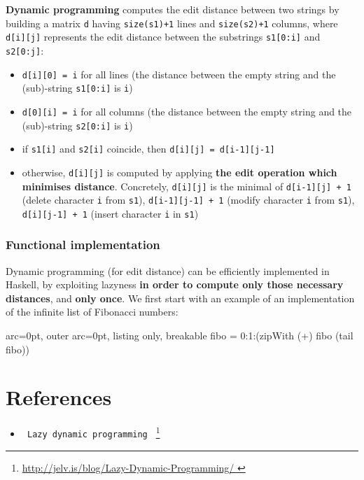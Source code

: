 \textbf{ Dynamic programming } computes the edit distance between two strings by building a matrix \texttt{d} having \texttt{size(s1)+1} lines and \texttt{size(s2)+1} columns, where \texttt{d[i][j]} represents the edit distance between the substrings \texttt{s1[0:i]} and \texttt{s2[0:j]}:
\begin{itemize}
	\item  \texttt{d[i][0] = i} for all lines (the distance between the empty string and the (sub)-string \texttt{s1[0:i]} is \texttt{i})
	\item  \texttt{d[0][i] = i} for all columns (the distance between the empty string and the (sub)-string \texttt{s2[0:i]} is \texttt{i})
	\item  if \texttt{s1[i]} and \texttt{s2[i]} coincide, then \texttt{d[i][j] = d[i-1][j-1]}
	\item  otherwise, \texttt{d[i][j]} is computed by applying \textbf{the edit operation which minimises distance}. Concretely, \texttt{d[i][j]} is the minimal of \texttt{d[i-1][j] + 1} (delete character \texttt{i} from \texttt{s1}), \texttt{d[i-1][j-1] + 1} (modify character \texttt{i} from \texttt{s1}), \texttt{d[i][j-1] + 1} (insert character \texttt{i} in \texttt{s1})
\end{itemize}


\subsubsection*{ Functional implementation }

Dynamic programming (for edit distance) can be efficiently implemented in Haskell, by exploiting lazyness \textbf{in order to compute only those necessary distances}, and \textbf{only once}. We first start with an example of an implementation of the infinite list of Fibonacci numbers:


\begin{tcblisting}{ arc=0pt, outer arc=0pt, listing only, breakable}
fibo = 0:1:(zipWith (+) fibo (tail fibo))

\end{tcblisting}


\section*{ References }

\begin{itemize}
	\item  \texttt{ Lazy dynamic programming } \footnote{\url{http://jelv.is/blog/Lazy-Dynamic-Programming/ }}
\end{itemize}
